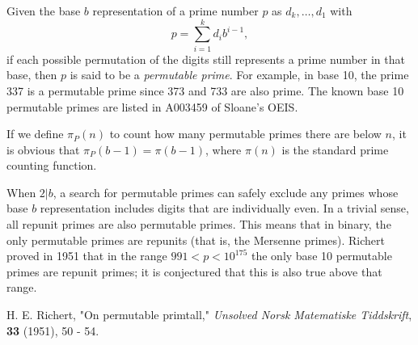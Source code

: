 \documentclass[12pt]{article}
\begin{document}
Given the base $b$ representation of a prime number $p$ as $d_k, \ldots , d_1$ with $$p = \sum_{i = 1}^k d_ib^{i - 1},$$ if each possible permutation of the digits still represents a prime number in that base, then $p$ is said to be a \emph{permutable prime}. For example, in base 10, the prime 337 is a permutable prime since 373 and 733 are also prime. The known base 10 permutable primes are listed in A003459 of Sloane's OEIS.

If we define $\pi_P(n)$ to count how many permutable primes there are below $n$, it is obvious that $\pi_P(b - 1) = \pi(b - 1)$, where $\pi(n)$ is the standard prime counting function.

When $2 \vert b$, a search for permutable primes can safely exclude any primes whose base $b$ representation includes digits that are individually even. In a trivial sense, all repunit primes are also permutable primes. This means that in binary, the only permutable primes are repunits (that is, the Mersenne primes). Richert proved in 1951 that in the range $991 < p < 10^{175}$ the only base 10 permutable primes are repunit primes; it is conjectured that this is also true above that range.

\begin{thebibliography}{1}
 H. E. Richert, "On permutable primtall," {\it Unsolved Norsk Matematiske Tiddskrift}, {\bf 33} (1951), 50 - 54.
\end{thebibliography}
\end{document}
